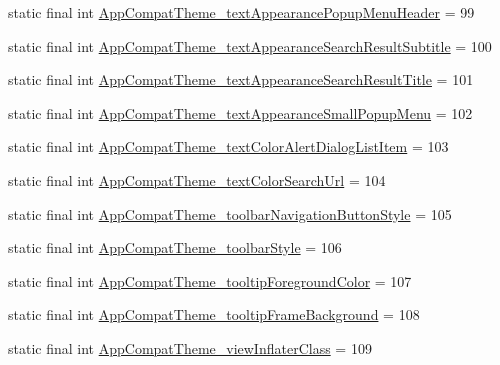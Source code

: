 \begin{DoxyCompactItemize}
\item 
static final int \mbox{\hyperlink{classandroid_1_1support_1_1design_1_1_r_1_1styleable_addc358699df35f00e24791fcf5f26807}{App\+Compat\+Theme\+\_\+text\+Appearance\+Popup\+Menu\+Header}} = 99
\item 
static final int \mbox{\hyperlink{classandroid_1_1support_1_1design_1_1_r_1_1styleable_ae732301800acf56ecc14851120c3f353}{App\+Compat\+Theme\+\_\+text\+Appearance\+Search\+Result\+Subtitle}} = 100
\item 
static final int \mbox{\hyperlink{classandroid_1_1support_1_1design_1_1_r_1_1styleable_a78d4bdf68398e78aba7de8f729f04608}{App\+Compat\+Theme\+\_\+text\+Appearance\+Search\+Result\+Title}} = 101
\item 
static final int \mbox{\hyperlink{classandroid_1_1support_1_1design_1_1_r_1_1styleable_ace3bf088ebfa5114c2b61e9549a48364}{App\+Compat\+Theme\+\_\+text\+Appearance\+Small\+Popup\+Menu}} = 102
\item 
static final int \mbox{\hyperlink{classandroid_1_1support_1_1design_1_1_r_1_1styleable_a2465ceaacdc9564a939edc3ee48bd2b1}{App\+Compat\+Theme\+\_\+text\+Color\+Alert\+Dialog\+List\+Item}} = 103
\item 
static final int \mbox{\hyperlink{classandroid_1_1support_1_1design_1_1_r_1_1styleable_a7d63bc68d23f5dc7d751b941c5e33e83}{App\+Compat\+Theme\+\_\+text\+Color\+Search\+Url}} = 104
\item 
static final int \mbox{\hyperlink{classandroid_1_1support_1_1design_1_1_r_1_1styleable_a92c316127259a6fb3a0452630c4bf70d}{App\+Compat\+Theme\+\_\+toolbar\+Navigation\+Button\+Style}} = 105
\item 
static final int \mbox{\hyperlink{classandroid_1_1support_1_1design_1_1_r_1_1styleable_a578439cfaa5e75a26e319935c8aeea2f}{App\+Compat\+Theme\+\_\+toolbar\+Style}} = 106
\item 
static final int \mbox{\hyperlink{classandroid_1_1support_1_1design_1_1_r_1_1styleable_a87883d9b44e4da6f3086c1f2912f52a1}{App\+Compat\+Theme\+\_\+tooltip\+Foreground\+Color}} = 107
\item 
static final int \mbox{\hyperlink{classandroid_1_1support_1_1design_1_1_r_1_1styleable_aa4e1632a24c4272e85b9c1168eb8b1ef}{App\+Compat\+Theme\+\_\+tooltip\+Frame\+Background}} = 108
\item 
static final int \mbox{\hyperlink{classandroid_1_1support_1_1design_1_1_r_1_1styleable_a703bafcee78557c2b6e7a190b927a979}{App\+Compat\+Theme\+\_\+view\+Inflater\+Class}} = 109
\item 

\end{DoxyCompactItemize}
